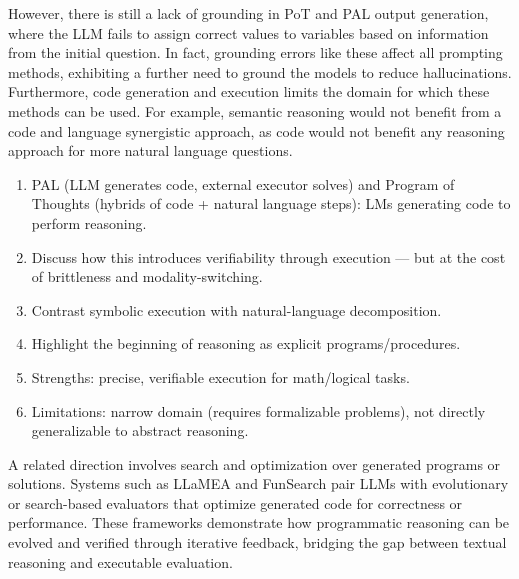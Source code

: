 \documentclass[project]{bsu-cs}  %
\begin{document}
However, there is still a lack of grounding in PoT and PAL output generation, where the LLM fails to assign correct values to variables based on information from the initial question. In fact, grounding errors like these affect all prompting methods, exhibiting a further need to ground the models to reduce hallucinations. Furthermore, code generation and execution limits the domain for which these methods can be used. For example, semantic reasoning would not benefit from a code and language synergistic approach, as code would not benefit any reasoning approach for more natural language questions. 

\begin{enumerate}
    \item PAL \citep{gao2023palprogramaidedlanguagemodels} (LLM generates code, external executor solves) and Program of Thoughts \citep{chen2023programthoughtspromptingdisentangling} (hybrids of code + natural language steps): LMs generating code to perform reasoning.

    \item Discuss how this introduces verifiability through execution — but at the cost of brittleness and modality-switching.

    \item Contrast symbolic execution with natural-language decomposition.

    \item Highlight the beginning of reasoning as explicit programs/procedures.

    \item Strengths: precise, verifiable execution for math/logical tasks.

    \item Limitations: narrow domain (requires formalizable problems), not directly generalizable to abstract reasoning.

\end{enumerate}

A related direction involves search and optimization over generated programs or solutions. Systems such as LLaMEA \citep{zhou2024llamea} and FunSearch \citep{rombach2024funsearch} pair LLMs with evolutionary or search-based evaluators that optimize generated code for correctness or performance. These frameworks demonstrate how programmatic reasoning can be evolved and verified through iterative feedback, bridging the gap between textual reasoning and executable evaluation.
% 
%
%
% 
\end{document}
